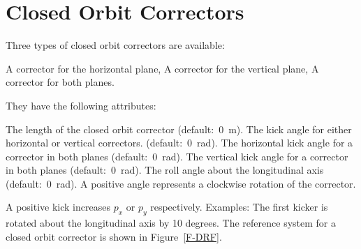 \section{Closed Orbit Correctors}
\label{S-KICK}
Three types of closed orbit correctors are available:
\begin{mylist}
A corrector for the horizontal plane,
A corrector for the vertical plane,
A corrector for both planes.
\end{mylist}
They have the following attributes:
\begin{mylist}
The length of the closed orbit corrector (default:~0~m).
The kick angle for either horizontal or vertical correctors.
(default:~0~rad).
The horizontal kick angle for a corrector in both planes
(default:~0~rad).
The vertical kick angle for a corrector in both planes
(default:~0~rad).
The roll angle about the longitudinal axis (default:~0~rad).
A positive angle represents a clockwise rotation of the corrector.
\end{mylist}
A positive kick increases \(p_{x}\) or \(p_{y}\) respectively.
Examples:
The first kicker is rotated about the longitudinal axis by 10 degrees.
The reference system for a closed orbit corrector is shown in
Figure~\ref{F-DRF}.
 
